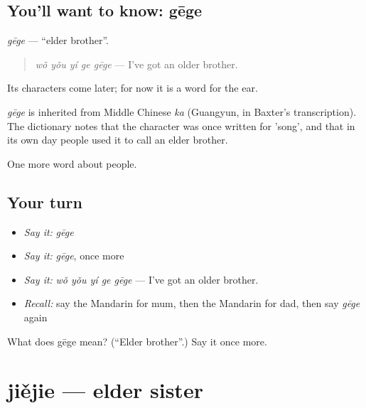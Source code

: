 \subsection*{You'll want to know: gēge}
\emph{gēge} — \textquotedblleft{}elder brother\textquotedblright{}.

\begin{quote}
\emph{wǒ yǒu yí ge gēge} — I've got an older brother.
\end{quote}

Its characters come later; for now it is a word for the ear.

\begin{cousinweb}
\emph{gēge} is inherited from Middle Chinese \emph{ka} (Guangyun, in Baxter's transcription). The dictionary notes that the character was once written for 'song', and that in its own day people used it to call an elder brother.
\end{cousinweb}

\begin{grammarlens}[title={What you've built}]
One more word about people.
\end{grammarlens}

\subsection*{Your turn}
\begin{itemize}
\raggedright
  \item \emph{Say it:} \emph{gēge}
  \item \emph{Say it:} \emph{gēge}, once more
  \item \emph{Say it:} \emph{wǒ yǒu yí ge gēge} — I've got an older brother.
  \item \emph{Recall:} say the Mandarin for mum, then the Mandarin for dad, then say \emph{gēge} again
\end{itemize}

\begin{tcolorbox}[breakable,colback=teal!4,colframe=teal!35!black,title={Before you move on}]
What does gēge mean? (\textquotedblleft{}Elder brother\textquotedblright{}.) Say it once more.
\end{tcolorbox}
\section[jiějie]{jiějie — elder sister}

\label{lesson:ZH-C32-jiejie}



